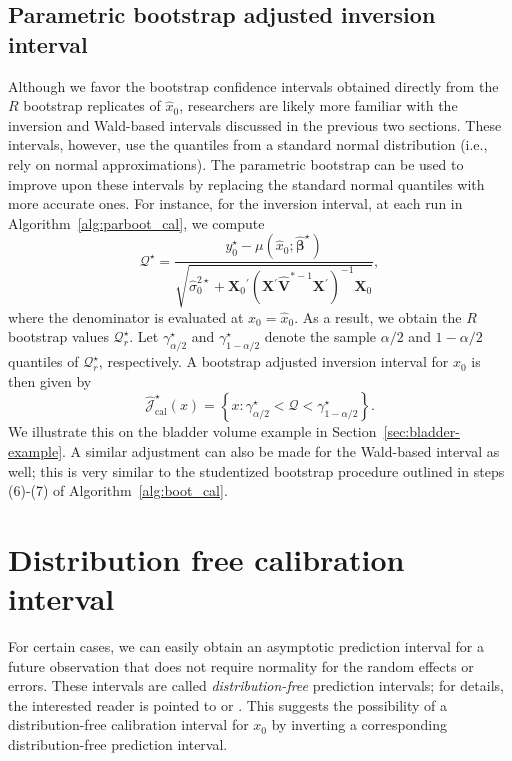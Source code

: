 \documentclass[cmfont,usenames,dvipsnames,leqno]{afit-etd}\usepackage[]{graphicx}\usepackage[]{color}
\newcommand{\boot}{\star} %
\newcommand{\trans}{\ensuremath{^\prime}}
\newcommand{\mc}[1]{\ensuremath{\mathcal{#1}}}
\newcommand{\wh}[1]{\ensuremath{\widehat{#1}}}
\newcommand{\X}{\ensuremath{\bm{X}}}
\begin{document}
\subsection{Parametric bootstrap adjusted inversion interval}
Although we favor the bootstrap confidence intervals obtained directly from the $R$ bootstrap replicates of $\wh{x}_0$, researchers are likely more familiar with the inversion and Wald-based intervals discussed in the previous two sections. These intervals, however, use the quantiles from a standard normal distribution (i.e., rely on normal approximations). The parametric bootstrap can be used to improve upon these intervals by replacing the standard normal quantiles with more accurate ones. For instance, for the inversion interval, at each run in Algorithm~\ref{alg:parboot_cal}, we compute
\begin{equation*}
  \mc{Q}^\boot = \frac{y_0^\boot - \mu\left(\wh{x}_0; \wh{\bm{\beta}}^\boot\right)}{\sqrt{\wh{\sigma}_0^{2\boot} + \X_0\trans\left(\X\trans\wh{\bm{V}}^{*-1}\X\trans\right)^{-1}\X_0}},
\end{equation*}
where the denominator is evaluated at $x_0 = \wh{x}_0$. As a result, we obtain the $R$ bootstrap values $\mc{Q}_r^\boot$. Let $\gamma_{\alpha/2}^\boot$ and $\gamma_{1-\alpha/2}^\boot$ denote the sample $\alpha/2$ and $1-\alpha/2$ quantiles of $\mc{Q}_r^\boot$, respectively. A bootstrap adjusted inversion interval for $x_0$ is then given by
\begin{equation}
\label{eqn:cal-lmm-inversion-boot}
  \wh{\mc{J}}_\mathrm{cal}^\boot(x) = \left\{ x: \gamma_{\alpha/2}^\boot < \mc{Q} < \gamma_{1-\alpha/2}^\boot \right\}.
\end{equation}
We illustrate this on the bladder volume example in Section~\ref{sec:bladder-example}. A similar adjustment can also be made for the Wald-based interval as well; this is very similar to the studentized bootstrap procedure outlined in steps (6)-(7) of Algorithm~\ref{alg:boot_cal}.

\section{Distribution free calibration interval}
\label{sec:calibration-lmm-distfree}
For certain cases, we can easily obtain an asymptotic prediction interval for a future observation that does not require normality for the random effects or errors. These intervals are called \textit{distribution-free} prediction intervals; for details, the interested reader is pointed to \citet{jiang_distribution_2002} or \citet{jiang_linear_2007}. This suggests the possibility of a distribution-free calibration interval for $x_0$ by inverting a corresponding distribution-free prediction interval.
\end{document}
